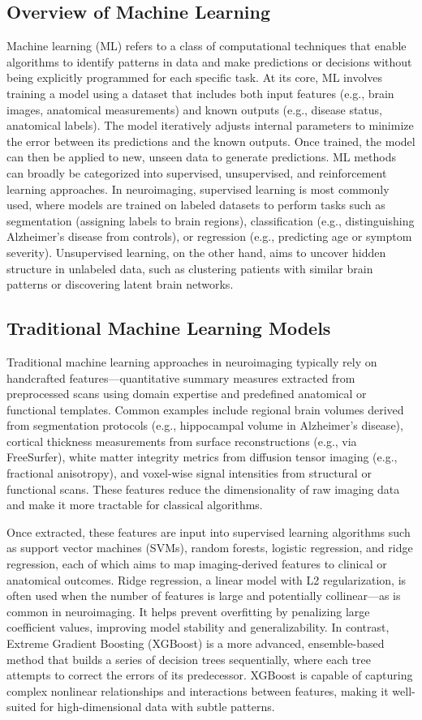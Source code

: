 \subsection{Overview of Machine Learning}
Machine learning (ML) refers to a class of computational techniques that enable algorithms to identify patterns in data and make predictions or decisions without being explicitly programmed for each specific task. At its core, ML involves training a model using a dataset that includes both input features (e.g., brain images, anatomical measurements) and known outputs (e.g., disease status, anatomical labels). The model iteratively adjusts internal parameters to minimize the error between its predictions and the known outputs. Once trained, the model can then be applied to new, unseen data to generate predictions.
ML methods can broadly be categorized into supervised, unsupervised, and reinforcement learning approaches. In neuroimaging, supervised learning is most commonly used, where models are trained on labeled datasets to perform tasks such as segmentation (assigning labels to brain regions), classification (e.g., distinguishing Alzheimer’s disease from controls), or regression (e.g., predicting age or symptom severity). Unsupervised learning, on the other hand, aims to uncover hidden structure in unlabeled data, such as clustering patients with similar brain patterns or discovering latent brain networks.
\subsection{Traditional Machine Learning Models}
Traditional machine learning approaches in neuroimaging typically rely on handcrafted features—quantitative summary measures extracted from preprocessed scans using domain expertise and predefined anatomical or functional templates. Common examples include regional brain volumes derived from segmentation protocols (e.g., hippocampal volume in Alzheimer’s disease), cortical thickness measurements from surface reconstructions (e.g., via FreeSurfer), white matter integrity metrics from diffusion tensor imaging (e.g., fractional anisotropy), and voxel-wise signal intensities from structural or functional scans. These features reduce the dimensionality of raw imaging data and make it more tractable for classical algorithms.

Once extracted, these features are input into supervised learning algorithms such as support vector machines (SVMs), random forests, logistic regression, and ridge regression, each of which aims to map imaging-derived features to clinical or anatomical outcomes. Ridge regression, a linear model with L2 regularization, is often used when the number of features is large and potentially collinear—as is common in neuroimaging. It helps prevent overfitting by penalizing large coefficient values, improving model stability and generalizability. In contrast, Extreme Gradient Boosting (XGBoost) is a more advanced, ensemble-based method that builds a series of decision trees sequentially, where each tree attempts to correct the errors of its predecessor. XGBoost is capable of capturing complex nonlinear relationships and interactions between features, making it well-suited for high-dimensional data with subtle patterns.

